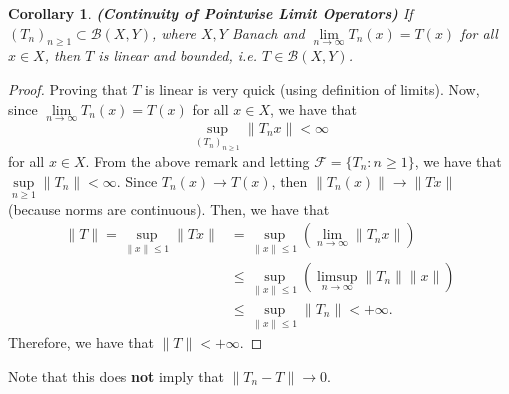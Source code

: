 \documentclass[12pt]{article}
\newtheorem{corollary}{Corollary}
\newcommand{\F}{{\mathscr F}}
\newcommand{\B}{\mathscr{B}}
\newcommand{\sbs}{\subset}
\newcommand{\lp}{\left(}
\newcommand{\rp}{\right)}
\begin{document}
 \begin{corollary}
 \textbf{(Continuity of Pointwise Limit Operators)} If $\lp T_n \rp_{n \geq 1} \sbs \B(X, Y)$, where $X, Y$ Banach and $\lim\limits_{n \to \infty} T_n(x) = T(x)$ for all $x \in X$, then $T$ is linear and bounded, i.e. $T \in \B(X, Y)$. 
 \end{corollary}
 \vspace{-25pt}
 \begin{proof}
 Proving that $T$ is linear is very quick (using definition of limits). Now, since $\lim\limits_{n \to \infty} T_n(x) = T(x)$ for all $x \in X$, we have that 
 \[\sup\limits_{(T_n)_{n \geq 1}} \| T_n x\| < \infty  \]
 for all $x \in X$. From the above remark and letting $\F = \{ T_n : n \geq 1\}$, we have that $\sup\limits_{n \geq 1} \| T_n \| < \infty$. Since $T_n(x) \to T(x)$, then $\|T_n(x) \| \to \| Tx \|$ (because norms are continuous). Then, we have that 
 \begin{align*}
 \| T \| = \sup\limits_{\| x \| \leq 1} \| Tx \| & = \sup\limits_{\| x \| \leq 1}  \lp \lim\limits_{ n \to \infty} \| T_n x \| \rp \\
 & \leq  \sup\limits_{\| x \| \leq 1}  \lp \limsup\limits_{ n \to \infty} \| T_n \| \| x \| \rp\\
 & \leq  \sup\limits_{\| x \| \leq 1}  \| T_n \| < + \infty.
 \end{align*}
 Therefore, we have that $\|T \| < + \infty$. 
 \end{proof}
 \vspace{-25pt}
 Note that this does \textbf{not} imply that $\| T_n - T \| \to 0$. 
\end{document}
